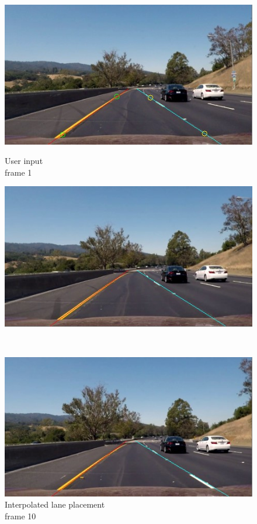 \begin{figure}[H]
\centering
\captionsetup{justification=centering}
\begin{minipage}[b]{0.45\linewidth}
    \includegraphics[width=\linewidth]{Figures/interpolation_lane_frame_0.jpg}
    \caption*{User input\\ frame 1}
\end{minipage}
\begin{minipage}[b]{0.45\linewidth}
    \includegraphics[width=\linewidth]{Figures/interpolation_lane_frame_10.jpg}
    \caption*{Interpolated lane placement\\ frame 10}
\end{minipage}
\vspace{5mm}\\
\begin{minipage}[b]{0.45\linewidth}
    \includegraphics[width=\linewidth]{Figures/interpolation_lane_frame_20.jpg}

\end{minipage}
\end{figure}

